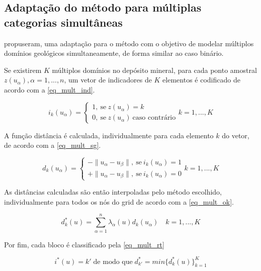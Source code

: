 \subsection{Adaptação do método para múltiplas categorias simultâneas}\label{multi_cat}

 propuseram, uma adaptação para o método com o objetivo de modelar múltiplos domínios geológicos simultaneamente, de forma similar ao caso binário.

Se existirem $K$ múltiplos domínios no depósito mineral, para cada ponto amostral ${z(u_\alpha),\alpha=1,...,n}$, um vetor de indicadores de $K$ elementos é codificado de acordo com a \autoref{eq_mult_ind}.

\begin{equation}
	i_k(u_\alpha)=\begin{cases}
	1,\:\textrm{se}\:z(u_\alpha)=k\\
    0,\:\textrm{se}\:z(u_\alpha)\:\textrm{caso contrário}\end{cases} k=1,...,K
    \label{eq_mult_ind}
\end{equation}

A função distância é calculada, individualmente para cada elemento $k$ do vetor, de acordo com a \autoref{eq_mult_sg}.

\begin{equation}
	d_k(u_\alpha)=\begin{cases}
	-\parallel u_\alpha-u_\beta\parallel,\:\textrm{se}\:i_k(u_\alpha)=1\\
	+\parallel u_\alpha-u_\beta\parallel,\:\textrm{se}\:i_k(u_\alpha)=0\end{cases} k=1,...,K
    \label{eq_mult_sg}
\end{equation}

As distâncias calculadas são então interpoladas pelo método escolhido, individualmente para todos os nós do grid de acordo com a \autoref{eq_mult_ok}.

\begin{equation}
	d_k^*(u)=\sum\limits_{\alpha=1}^n \lambda_\alpha(u)d_k(u_\alpha)\quad k=1,...,K
    \label{eq_mult_ok}
\end{equation}

Por fim, cada bloco é  classificado pela \autoref{eq_mult_rt}

\begin{equation}
	i^*(u)=k'\;\text{de modo que}\;d_{k'}^*=min\{d_k^*(u)\}_{k=1}^K
    \label{eq_mult_rt}
\end{equation}

